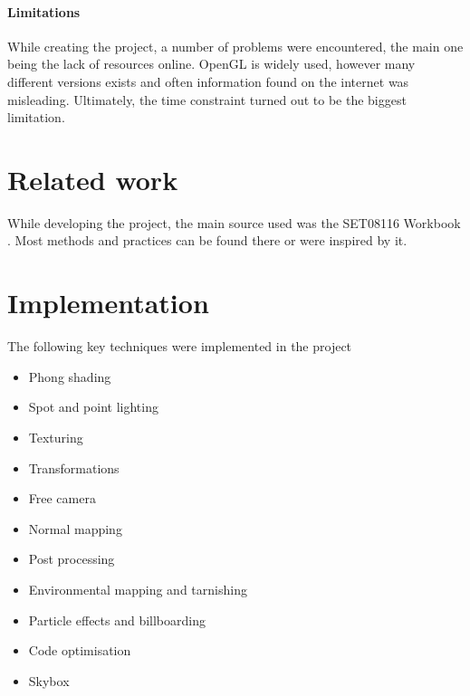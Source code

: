 \documentclass[10pt, a4paper]{article}
\begin{document}
    \paragraph{Limitations}
    While creating the project, a number of problems were encountered, the main one being the lack of resources online. OpenGL is widely used, however many different versions exists and often information found on the internet was misleading. Ultimately, the time constraint turned out to be the biggest limitation.

    \section{Related work}
    While developing the project, the main source used was the SET08116 Workbook \cite{workbook}. Most methods and practices can be found there or were inspired by it.

    \section{Implementation}
    The following key techniques were implemented in the project
    \begin{itemize}
        \item Phong shading
        \item Spot and point lighting
        \item Texturing
        \item Transformations
        \item Free camera
        \item Normal mapping
        \item Post processing
        \item Environmental mapping and tarnishing
        \item Particle effects and billboarding
        \item Code optimisation
        \item Skybox
    \end{itemize}
\end{document}
